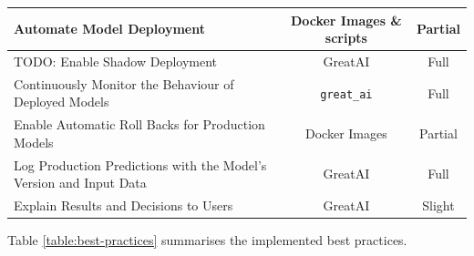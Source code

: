 \begin{table}
\begin{tabular}{p{7cm}@{\hskip 0.5cm}c@{\hskip 0.5cm}c}
Automate Model Deployment & Docker Images \& scripts & Partial \\\hline
TODO: Enable Shadow Deployment & GreatAI & Full \\\hline
Continuously Monitor the Behaviour of Deployed Models & \texttt{great\_ai} & Full \\\hline
Enable Automatic Roll Backs for Production Models &  Docker Images & Partial \\\hline
Log Production Predictions with the Model's Version and Input Data & GreatAI & Full \\\hline

Explain Results and Decisions to Users & GreatAI & Slight \\\hline
\end{tabular}
\end{table}


Table \ref{table:best-practices} summarises the implemented best practices.
